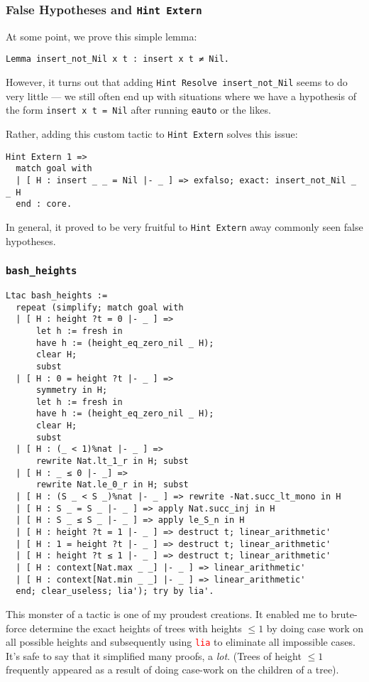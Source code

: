 \documentclass[acmsmall, authorversion, nonacm, overload]{acmart}
\begin{document}
\subsubsection{False Hypotheses and \texttt{Hint Extern}}
At some point, we prove this simple lemma:
\begin{verbatim}
Lemma insert_not_Nil x t : insert x t ≠ Nil.
\end{verbatim}
However, it turns out that adding \verb|Hint Resolve insert_not_Nil|
seems to do very little ---
we still often end up with situations where we have a hypothesis of the form \texttt{insert x t = Nil}
after running \texttt{eauto} or the likes.

Rather, adding this custom tactic to \verb|Hint Extern| solves this issue:
\begin{verbatim}
Hint Extern 1 =>
  match goal with
  | [ H : insert _ _ = Nil |- _ ] => exfalso; exact: insert_not_Nil _ _ H
  end : core.
\end{verbatim}
In general, it proved to be very fruitful to \verb|Hint Extern| away commonly seen false hypotheses.

\subsubsection{\texttt{bash_heights}}
\begin{verbatim}
Ltac bash_heights :=
  repeat (simplify; match goal with
  | [ H : height ?t = 0 |- _ ] =>
      let h := fresh in
      have h := (height_eq_zero_nil _ H);
      clear H;
      subst
  | [ H : 0 = height ?t |- _ ] =>
      symmetry in H;
      let h := fresh in
      have h := (height_eq_zero_nil _ H);
      clear H;
      subst
  | [ H : (_ < 1)%nat |- _ ] =>
      rewrite Nat.lt_1_r in H; subst
  | [ H : _ ≤ 0 |- _] =>
      rewrite Nat.le_0_r in H; subst
  | [ H : (S _ < S _)%nat |- _ ] => rewrite -Nat.succ_lt_mono in H
  | [ H : S _ = S _ |- _ ] => apply Nat.succ_inj in H
  | [ H : S _ ≤ S _ |- _ ] => apply le_S_n in H
  | [ H : height ?t = 1 |- _ ] => destruct t; linear_arithmetic'
  | [ H : 1 = height ?t |- _ ] => destruct t; linear_arithmetic'
  | [ H : height ?t ≤ 1 |- _ ] => destruct t; linear_arithmetic'
  | [ H : context[Nat.max _ _] |- _ ] => linear_arithmetic'
  | [ H : context[Nat.min _ _] |- _ ] => linear_arithmetic'
  end; clear_useless; lia'); try by lia'.
\end{verbatim}
This monster of a tactic is one of my proudest creations.
It enabled me to brute-force determine
the exact heights of trees with heights $\le 1$ by doing case work on all possible heights
and subsequently using \texttt{\textcolor{red}{lia}} to eliminate all impossible cases.
It's safe to say that it simplified many proofs, a \emph{lot}.
(Trees of height $\le 1$ frequently appeared as a result of doing case-work on the children
of a tree).
\end{document}
